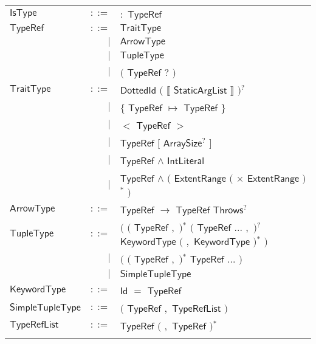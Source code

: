  
\begin{longtable}[l]{p{3cm}rl}
$\mathsf{IsType}$ &  $\mathsf{::=}$  & $\mathbf{:}$ $\mathsf{TypeRef}$ \\
$\mathsf{TypeRef}$ &  $\mathsf{::=}$  & $\mathsf{TraitType}$ \\
 & $\big|$ &  $\mathsf{ArrowType}$ \\
 & $\big|$ &  $\mathsf{TupleType}$ \\
 & $\big|$ &  $\big($  $\mathsf{TypeRef}$ $\mathbf{?}$ $\big)$ \\
$\mathsf{TraitType}$ &  $\mathsf{::=}$  & $\mathsf{DottedId}$ $\big($  $\mathbf{\llbracket}$ $\mathsf{StaticArgList}$ $\mathbf{\rrbracket}$ $\big)$$^?$ \\
 & $\big|$ &  $\mathbf{\{}$ $\mathsf{TypeRef}$ $\mathbf{\mapsto}$ $\mathsf{TypeRef}$ $\mathbf{\}}$ \\
 & $\big|$ &  $\mathbf{<}$ $\mathsf{TypeRef}$ $\mathbf{>}$ \\
 & $\big|$ &  $\mathsf{TypeRef}$ $\mathbf{[}$ $\mathsf{ArraySize}$$^?$ $\mathbf{]}$ \\
 & $\big|$ &  $\mathsf{TypeRef}$ $\mathbf{\wedge}$ $\mathsf{IntLiteral}$ \\
 & $\big|$ &  $\mathsf{TypeRef}$ $\mathbf{\wedge}$ $\big($  $\mathsf{ExtentRange}$ $\big($  $\mathbf{\times}$ $\mathsf{ExtentRange}$ $\big)$$^*$ $\big)$ \\
$\mathsf{ArrowType}$ &  $\mathsf{::=}$  & $\mathsf{TypeRef}$ $\mathbf{\rightarrow}$ $\mathsf{TypeRef}$ $\mathsf{Throws}$$^?$ \\
$\mathsf{TupleType}$ &  $\mathsf{::=}$  & $\big($  $\big($  $\mathsf{TypeRef}$ $\mathbf{,}$ $\big)$$^*$ $\big($  $\mathsf{TypeRef}$ $\mathbf{...}$ $\mathbf{,}$ $\big)$$^?$ $\mathsf{KeywordType}$ $\big($  $\mathbf{,}$ $\mathsf{KeywordType}$ $\big)$$^*$ $\big)$ \\
 & $\big|$ &  $\big($  $\big($  $\mathsf{TypeRef}$ $\mathbf{,}$ $\big)$$^*$ $\mathsf{TypeRef}$ $\mathbf{...}$ $\big)$ \\
 & $\big|$ &  $\mathsf{SimpleTupleType}$ \\
$\mathsf{KeywordType}$ &  $\mathsf{::=}$  & $\mathsf{Id}$ $\mathbf{=}$ $\mathsf{TypeRef}$ \\
$\mathsf{SimpleTupleType}$ &  $\mathsf{::=}$  & $\big($  $\mathsf{TypeRef}$ $\mathbf{,}$ $\mathsf{TypeRefList}$ $\big)$ \\
$\mathsf{TypeRefList}$ &  $\mathsf{::=}$  & $\mathsf{TypeRef}$ $\big($  $\mathbf{,}$ $\mathsf{TypeRef}$ $\big)$$^*$ \\
$$
\end{longtable}
